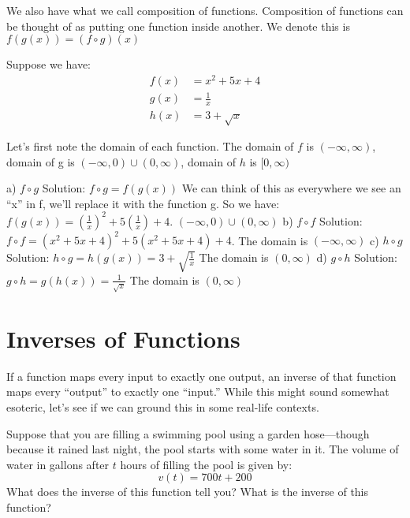 \documentclass{ximera}
\begin{document}
We also have what we call composition of functions.  Composition of
functions can be thought of as putting one function inside another.
We denote this is $f(g(x))=(f\circ g)(x)$

\begin{example}
 Suppose we have:
\begin{align}
  f(x)&={{x}^{2}}+5x+4 \\ 
  g(x)&=\frac{1}{x} \\ 
  h(x)&=3+\sqrt{x}
\end{align}

Let’s first note the domain of each function.  The domain of $f$
is $(-\infty ,\infty )$, domain of g is $(-\infty ,0)\cup (0,\infty )$,
domain of $h$ is $[0,\infty )$
 
a)	$f\circ g$ 
Solution: $f\circ g=f(g(x))$ We can think of this as everywhere we see an “x” in f, we’ll replace it with the function g. So we have: $f(g(x))={{\left( \frac{1}{x} \right)}^{2}}+5\left( \frac{1}{x} \right)+4$.  $(-\infty ,0)\cup (0,\infty )$
b)	$f\circ f$ 
Solution: $f\circ f={{\left( {{x}^{2}}+5x+4 \right)}^{2}}+5\left( {{x}^{2}}+5x+4 \right)+4$.  The domain is $(-\infty ,\infty )$
c)	$h\circ g$  
Solution: $h\circ g=h(g(x))=3+\sqrt{\frac{1}{x}}$ The domain is $(0,\infty )$
d)	$g\circ h$ 
Solution:$g\circ h=g(h(x))=\frac{1}{\sqrt{x}}$ The domain is $(0,\infty )$
\end{example}



\section{Inverses of Functions}


If a function maps every input to exactly one output, an inverse of that
function maps every ``output'' to exactly one ``input.'' While this
might sound somewhat esoteric, let's see if we can ground this in
some real-life contexts.

\begin{example}
Suppose that you are filling a swimming pool using a garden
hose---though because it rained last night, the pool starts with some
water in it. The volume of water in gallons after $t$ hours of
filling the pool is given by:
\[
v(t) = 700t + 200
\]
What does the inverse of this function tell you? What is the inverse
of this function?
\end{example}
\end{document}
